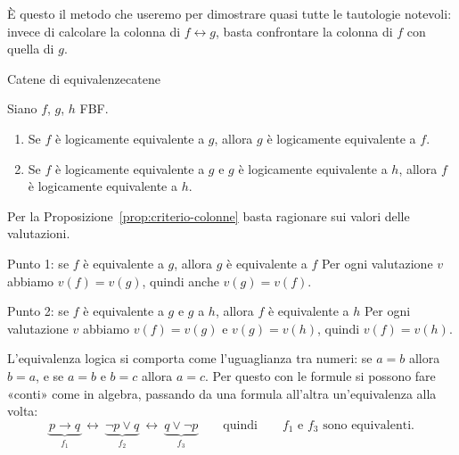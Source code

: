 È questo il metodo che useremo per dimostrare quasi tutte le tautologie notevoli: invece di calcolare la
colonna di $f \leftrightarrow g$, basta confrontare la colonna di $f$ con quella di $g$.

\begin{concetto}
\begin{Corollario}{Catene di equivalenze}{catene}
    \begin{prerequisiti}
    \end{prerequisiti}
    Siano $f$, $g$, $h$ FBF.
    \begin{enumerate}
        \item Se $f$ è logicamente equivalente a $g$, allora $g$ è logicamente equivalente a $f$.
        \item Se $f$ è logicamente equivalente a $g$ e $g$ è logicamente equivalente a $h$, allora
              $f$ è logicamente equivalente a $h$.
    \end{enumerate}
\end{Corollario}

\begin{dimostrazione}
    Per la Proposizione~\ref{prop:criterio-colonne} basta ragionare sui valori delle valutazioni.
    \begin{caso}{Punto 1: se $f$ è equivalente a $g$, allora $g$ è equivalente a $f$}
        Per ogni valutazione $v$ abbiamo $v(f) = v(g)$, quindi anche $v(g) = v(f)$.
    \end{caso}
    \begin{caso}{Punto 2: se $f$ è equivalente a $g$ e $g$ a $h$, allora $f$ è equivalente a $h$}
        Per ogni valutazione $v$ abbiamo $v(f) = v(g)$ e $v(g) = v(h)$, quindi $v(f) = v(h)$.
    \end{caso}
\end{dimostrazione}
\end{concetto}

\begin{spiegazione}
    L'equivalenza logica si comporta come l'uguaglianza tra numeri: se $a = b$ allora $b = a$, e se $a = b$ e $b = c$ allora $a = c$. Per questo con le
    formule si possono fare «conti» come in algebra, passando da una formula all'altra un'equivalenza alla volta:
    \[ \underbrace{p \rightarrow q}_{f_1} \ \leftrightarrow\ \underbrace{\neg p \vee q}_{f_2} \ \leftrightarrow\ \underbrace{q \vee \neg p}_{f_3}
       \qquad\text{quindi}\qquad f_1 \text{ e } f_3 \text{ sono equivalenti.} \]
\end{spiegazione}


